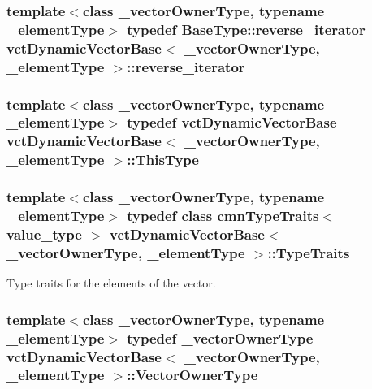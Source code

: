 \subsubsection[{reverse\+\_\+iterator}]{\setlength{\rightskip}{0pt plus 5cm}template$<$class \+\_\+vector\+Owner\+Type, typename \+\_\+element\+Type$>$ typedef {\bf Base\+Type\+::reverse\+\_\+iterator} {\bf vct\+Dynamic\+Vector\+Base}$<$ \+\_\+vector\+Owner\+Type, \+\_\+element\+Type $>$\+::{\bf reverse\+\_\+iterator}}\label{classvct_dynamic_vector_base_ad569da2c70b9f9468f466f59535d53c7}
\hypertarget{classvct_dynamic_vector_base_ae4c00cc291df57593d6a73c838ae897a}{}
\subsubsection[{This\+Type}]{\setlength{\rightskip}{0pt plus 5cm}template$<$class \+\_\+vector\+Owner\+Type, typename \+\_\+element\+Type$>$ typedef {\bf vct\+Dynamic\+Vector\+Base} {\bf vct\+Dynamic\+Vector\+Base}$<$ \+\_\+vector\+Owner\+Type, \+\_\+element\+Type $>$\+::{\bf This\+Type}}\label{classvct_dynamic_vector_base_ae4c00cc291df57593d6a73c838ae897a}
\hypertarget{classvct_dynamic_vector_base_ae5ebb885e67454fa18cb8101f1acc8dd}{}
\subsubsection[{Type\+Traits}]{\setlength{\rightskip}{0pt plus 5cm}template$<$class \+\_\+vector\+Owner\+Type, typename \+\_\+element\+Type$>$ typedef class {\bf cmn\+Type\+Traits}$<$ value\+\_\+type $>$ {\bf vct\+Dynamic\+Vector\+Base}$<$ \+\_\+vector\+Owner\+Type, \+\_\+element\+Type $>$\+::{\bf Type\+Traits}}\label{classvct_dynamic_vector_base_ae5ebb885e67454fa18cb8101f1acc8dd}
Type traits for the elements of the vector. \hypertarget{classvct_dynamic_vector_base_a563d79f5b4dd71f037192fe2961b48eb}{}
\subsubsection[{Vector\+Owner\+Type}]{\setlength{\rightskip}{0pt plus 5cm}template$<$class \+\_\+vector\+Owner\+Type, typename \+\_\+element\+Type$>$ typedef \+\_\+vector\+Owner\+Type {\bf vct\+Dynamic\+Vector\+Base}$<$ \+\_\+vector\+Owner\+Type, \+\_\+element\+Type $>$\+::{\bf Vector\+Owner\+Type}}\label{classvct_dynamic_vector_base_a563d79f5b4dd71f037192fe2961b48eb}
\hypertarget{classvct_dynamic_vector_base_ad3db797a792ca2ced6433a42b0fa54d6}{}
